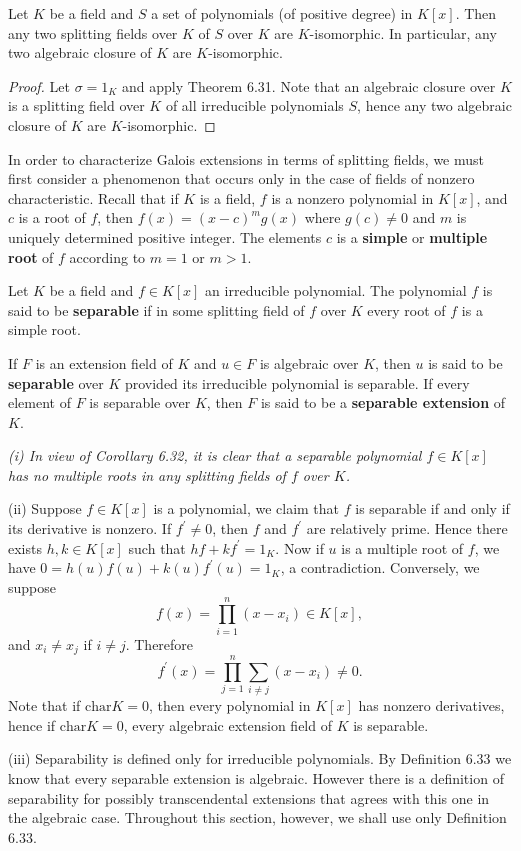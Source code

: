 \begin{corollary}
Let $K$ be a field and $S$ a set of polynomials (of positive degree) in $K[x]$. Then any two splitting fields over $K$ of $S$ over $K$ are $K$-isomorphic. In particular, any two algebraic closure of $K$ are $K$-isomorphic.
\end{corollary}
\begin{proof}
Let $\sigma=1_K$ and apply Theorem 6.31. Note that an algebraic closure over $K$ is a splitting field over $K$ of all irreducible polynomials $S$, hence any two algebraic closure of $K$ are $K$-isomorphic.
\end{proof}
In order to characterize Galois extensions in terms of splitting fields, we must first consider a phenomenon that occurs only in the case of fields of nonzero characteristic. Recall that if $K$ is a field, $f$ is a nonzero polynomial in $K[x]$, and $c$ is a root of $f$, then $f(x)=(x-c)^mg(x)$ where $g(c)\ne 0$ and $m$ is uniquely determined positive integer. The elements $c$ is a \textbf{simple} or \textbf{multiple root} of $f$ according to $m=1$ or $m>1$.
\begin{definition}
Let $K$ be a field and $f\in K[x]$ an irreducible polynomial. The polynomial $f$ is said to be \textbf{separable} if in some splitting field of $f$ over $K$ every root of $f$ is a simple root.\par
If $F$ is an extension field of $K$ and $u\in F$ is algebraic over $K$, then $u$ is said to be \textbf{separable} over $K$ provided its irreducible polynomial is separable. If every element of $F$ is separable over $K$, then $F$ is said to be a \textbf{separable extension} of $K$.
\end{definition}
\begin{note}\em
(i) In view of Corollary 6.32, it is clear that a separable polynomial $f\in K[x]$ has no multiple roots in any splitting fields of $f$ over $K$.\par
(ii) Suppose $f\in K[x]$ is a polynomial, we claim that $f$ is separable if and only if its derivative is nonzero. If $f^\prime\ne 0$, then $f$ and $f^\prime$ are relatively prime. Hence there exists $h,k\in K[x]$ such that $hf+kf^\prime=1_K$. Now if $u$ is a multiple root of $f$, we have $0=h(u)f(u)+k(u)f^\prime(u)=1_K$, a contradiction. Conversely, we suppose 
$$
f\left( x \right) =\prod_{i=1}^n{\left( x-x_i \right)}\in K\left[ x \right] ,
$$
and $x_i\ne x_j$ if $i\ne j$. Therefore 
$$
f^{\prime}\left( x \right) =\prod_{j=1}^n{\sum_{i\ne j}{\left( x-x_i \right)}}\ne 0.
$$
Note that if $\mathrm{char}K=0$, then every polynomial in $K[x]$ has nonzero derivatives, hence if $\mathrm{char}K=0$, every algebraic extension field of $K$ is separable.\par
(iii) Separability is defined only for irreducible polynomials. By Definition 6.33 we know that every separable extension is algebraic. However there is a definition of separability for possibly transcendental extensions that agrees with this one in the algebraic case. Throughout this section, however, we shall use only Definition 6.33.
\end{note}
